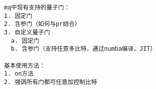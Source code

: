 \begin{lstlisting}
mq中现有支持的量子门：
1. 固定门
2. 含参门（如何与pr结合）
3. 自定义量子门
  a. 固定门
  b. 含参门（支持任意多比特，通过numba编译，JIT）

基本使用方法：
1. on方法
2. 强调所有门都可任意加控制比特
\end{lstlisting}